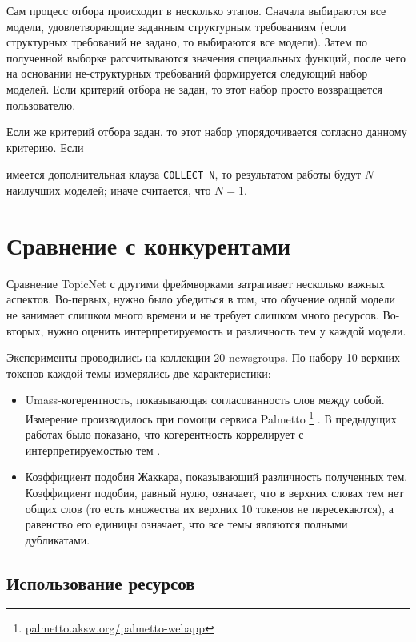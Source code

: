 Сам процесс отбора происходит в несколько этапов. Сначала выбираются все модели, удовлетворяющие заданным структурным требованиям (если структурных требований не задано, то выбираются все модели). Затем по полученной выборке рассчитываются значения специальных функций, после чего на основании не-структурных требований формируется следующий набор моделей. Если критерий отбора не задан, то этот набор просто возвращается пользователю. 

Если же критерий отбора задан, то этот набор упорядочивается согласно данному критерию. Если

имеется дополнительная клауза \texttt{COLLECT N}, то результатом работы будут $N$ наилучших моделей; иначе считается, что $N=1$.  

\section{Сравнение с конкурентами} 

Сравнение TopicNet с другими фреймворками затрагивает несколько важных аспектов. Во-первых, нужно было убедиться в том, что обучение одной модели не занимает слишком много времени и не требует слишком много ресурсов. Во-вторых, нужно оценить интерпретируемость и различность тем у каждой модели.  

Эксперименты проводились на коллекции 20 newsgroups. По набору 10 верхних токенов каждой темы измерялись две характеристики:

\begin{itemize}
    \item Umass-когерентность, показывающая согласованность слов между собой. Измерение производилось при помощи сервиса Palmetto \footnote{\url{palmetto.aksw.org/palmetto-webapp} } \cite{roder2015exploring}. В предыдущих работах было показано, что когерентность коррелирует с интерпретируемостью тем \cite{mimno2011}.
    \item Коэффициент подобия Жаккара, показывающий различность полученных тем. Коэффициент подобия, равный нулю, означает, что в верхних словах тем нет общих слов (то есть множества их верхних 10 токенов не пересекаются), а равенство его единицы означает, что все темы являются полными дубликатами.
\end{itemize} 

\subsection{Использование ресурсов} 

